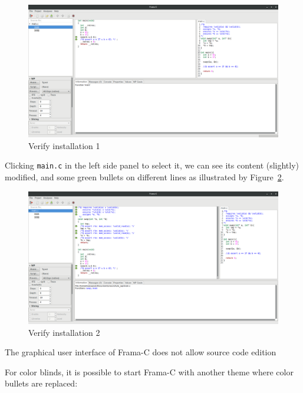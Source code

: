 \documentclass[12pt,francais,]{scrbook}
\newenvironment{Shaded}{}{}
\newcommand{\KeywordTok}[1]{\textcolor[rgb]{0.00,0.44,0.13}{\textbf{{#1}}}}
\newenvironment{zdsalertblock}[1]{%
  \tcolorbox[beamer,%
    noparskip,breakable,
    colback=LightCoral,colframe=DarkRed,%
    colbacklower=Tomato,%
    title=#1]
}{\endtcolorbox}
\newenvironment{zdsblock}[1]{%
  \tcolorbox[beamer,%
    noparskip,breakable,
    colback=LightBlue,colframe=DarkBlue,%
    colbacklower=DarkBlue,%
    title=#1]
}{\endtcolorbox}
\begin{document}
\begin{figure}[htbp]
\centering
\includegraphics[scale=0.5]{1-2-verif_install-1.png}
\caption{Verify installation 1}
\label{fig:install-1}
\end{figure}

Clicking \texttt{main.c} in the left side panel to select it, we can see
its content (slightly) modified, and some green bullets on different
lines as illustrated by Figure~\ref{fig:install-2}.

\begin{figure}[htbp]
\centering
\includegraphics[scale=0.5]{1-2-verif_install-2.png}
\caption{Verify installation 2}
\label{fig:install-2}
\end{figure}

\begin{zdsalertblock}{Warning}
  The graphical user interface of Frama-C does not allow source code edition
\end{zdsalertblock}

\begin{zdsblock}{Information}
  For color blinds, it is possible to start Frama-C with another theme where
  color bullets are replaced:
  \begin{footnotesize}\begin{Shaded}
  \end{Shaded}\end{footnotesize}
\end{zdsblock}
\end{document}

